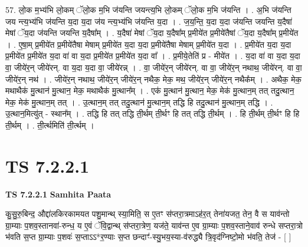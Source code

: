 \documentclass[17pt]{extarticle}
\begin{document}
57. लो॒क म॒भ्य॑भि लो॒कम् ॅलो॒क म॒भि ज॑यन्ति जयन्त्य॒भि लो॒कम् ॅलो॒क म॒भि ज॑यन्ति । . अ॒भि ज॑यन्ति जय न्त्य॒भ्य॑भि ज॑यन्ति य॒दा य॒दा ज॑य न्त्य॒भ्य॑भि ज॑यन्ति य॒दा । . ज॒य॒न्ति॒ य॒दा य॒दा ज॑यन्ति जयन्ति य॒दैषा॑ मेषां ॅय॒दा ज॑यन्ति जयन्ति य॒दैषा᳚म् । . य॒दैषा॑ मेषां ॅय॒दा य॒दैषा᳚म् प्र॒मीये॑त प्र॒मीये॑तैषां ॅय॒दा य॒दैषा᳚म् प्र॒मीये॑त । . ए॒षा॒म् प्र॒मीये॑त प्र॒मीये॑तैषा मेषाम् प्र॒मीये॑त य॒दा य॒दा प्र॒मीये॑तैषा मेषाम् प्र॒मीये॑त य॒दा । . प्र॒मीये॑त य॒दा य॒दा प्र॒मीये॑त प्र॒मीये॑त य॒दा वा॑ वा य॒दा प्र॒मीये॑त प्र॒मीये॑त य॒दा वा᳚ । . प्र॒मीये॒तेति॑ प्र - मीये॑त । . य॒दा वा॑ वा य॒दा य॒दा वा॒ जीये॑र॒न् जीये॑रन्. वा य॒दा य॒दा वा॒ जीये॑रन्न् । . वा॒ जीये॑र॒न् जीये॑रन्. वा वा॒ जीये॑र॒न् नथाथ॒ जीये॑रन्. वा वा॒ जीये॑र॒न् नथ॑ । . जीये॑र॒न् नथाथ॒ जीये॑र॒न् जीये॑र॒न् नथैक॒ मेक॒ मथ॒ जीये॑र॒न् जीये॑र॒न् नथैक᳚म् । . अथैक॒ मेक॒ मथाथैक॑ मु॒त्थान॑ मु॒त्थान॒ मेक॒ मथाथैक॑ मु॒त्थान᳚म् । . एक॑ मु॒त्थान॑ मु॒त्थान॒ मेक॒ मेक॑ मु॒त्थान॒म् तत् तदु॒त्थान॒ मेक॒ मेक॑ मु॒त्थान॒म् तत् । . उ॒त्थान॒म् तत् तदु॒त्थान॑ मु॒त्थान॒म् तद्धि हि तदु॒त्थान॑ मु॒त्थान॒म् तद्धि । . उ॒त्थान॒मित्यु॑त् - स्थान᳚म् । . तद्धि हि तत् तद्धि ती॒र्थम् ती॒र्थꣳ हि तत् तद्धि ती॒र्थम् । . हि ती॒र्थम् ती॒र्थꣳ हि हि ती॒र्थम् । . ती॒र्त्थमिति॑ ती॒र्त्थम् । \newline
\pagebreak
{}

\section{ TS 7.2.2.1 }

\textbf{TS 7.2.2.1 } \newline
\textbf{Samhita Paata} \newline

कु॒सु॒रु॒बिन्द॒ औद्दा॑लकिरकामयत पशु॒मान्थ् स्या॒मिति॒ स ए॒तꣳ स॑प्तरा॒त्रमाऽह॑र॒त् तेना॑यजत॒ तेन॒ वै स याव॑न्तो ग्रा॒म्याः प॒शव॒स्तानवा॑-रुन्ध॒ य ए॒वं ॅवि॒द्वान्थ् स॑प्तरा॒त्रेण॒ यज॑ते॒ याव॑न्त ए॒व ग्रा॒म्याः प॒शव॒स्ताने॒वाव॑ रुन्धे सप्तरा॒त्रो भ॑वति स॒प्त ग्रा॒म्याः प॒शवः॑ स॒प्ताऽऽ*र॒ण्याः स॒प्त छन्दाꣳ॑-स्यु॒भय॒स्या-व॑रुद्ध्यै त्रि॒वृद॑ग्निष्टो॒मो भ॑वति॒ तेज॑ - [  ] \newline
\end{document}
